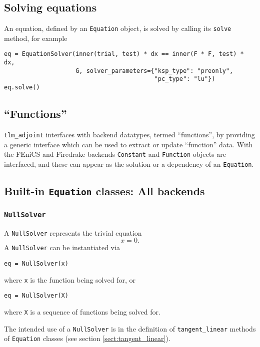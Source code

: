 \documentclass[11pt]{article}
\begin{document}
\subsection{Solving equations}

An equation, defined by an \texttt{Equation} object, is solved by calling its
\texttt{solve} method, for example
\begin{lstlisting}
eq = EquationSolver(inner(trial, test) * dx == inner(F * F, test) * dx,
                    G, solver_parameters={"ksp_type": "preonly",
                                          "pc_type": "lu"})
eq.solve()
\end{lstlisting}

\subsection{``Functions''}

\texttt{tlm\_adjoint} interfaces with backend datatypes, termed ``functions'',
by providing a generic interface which can be used to extract or update
``function'' data. With the FEniCS and Firedrake backends \texttt{Constant} and
\texttt{Function} objects are interfaced, and these can appear as the solution
or a dependency of an \texttt{Equation}.

\subsection{Built-in \texttt{Equation} classes: All backends}

\subsubsection{\texttt{NullSolver}}

A \texttt{NullSolver} represents the trivial equation
\begin{equation*}
  x = 0.
\end{equation*}
A \texttt{NullSolver} can be instantiated via
\begin{lstlisting}
eq = NullSolver(x)
\end{lstlisting}
where \texttt{x} is the function being solved for, or
\begin{lstlisting}
eq = NullSolver(X)
\end{lstlisting}
where \texttt{X} is a sequence of functions being solved for.

The intended use of a \texttt{NullSolver} is in the definition of
\texttt{tangent\_linear} methods of \texttt{Equation} classes (see section
\ref{sect:tangent_linear}).
\end{document}
